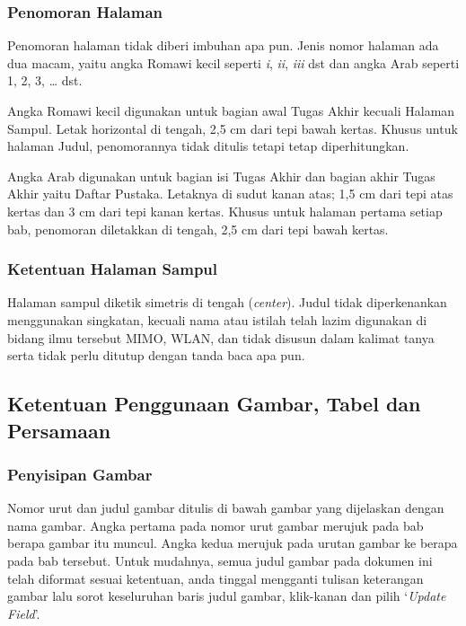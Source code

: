 \documentclass{final_project}
\begin{document}
\subsubsection{Penomoran Halaman}

Penomoran halaman tidak diberi imbuhan apa pun. Jenis nomor halaman ada dua macam, yaitu angka Romawi kecil seperti \textit{i}, \textit{ii}, \textit{iii} dst dan angka Arab seperti 1, 2, 3, … dst.

Angka Romawi kecil digunakan untuk bagian awal Tugas Akhir kecuali Halaman Sampul. Letak horizontal di tengah, 2,5 cm dari tepi bawah kertas. Khusus untuk halaman Judul, penomorannya tidak ditulis tetapi tetap diperhitungkan. 

Angka Arab digunakan untuk bagian isi Tugas Akhir dan bagian akhir Tugas Akhir yaitu Daftar Pustaka. Letaknya di sudut kanan atas; 1,5 cm dari tepi atas kertas dan 3 cm dari tepi kanan kertas. Khusus untuk halaman pertama setiap bab, penomoran diletakkan di tengah, 2,5 cm dari tepi bawah kertas. 

\subsubsection{Ketentuan Halaman Sampul}

Halaman sampul diketik simetris di tengah (\textit{center}). Judul tidak diperkenankan menggunakan singkatan, kecuali nama atau istilah telah lazim digunakan di bidang ilmu tersebut MIMO, WLAN,  dan tidak disusun dalam kalimat tanya serta tidak perlu ditutup dengan tanda baca apa pun. 

\subsection{Ketentuan Penggunaan Gambar, Tabel dan Persamaan}

\subsubsection{Penyisipan Gambar}

Nomor urut dan judul gambar ditulis di bawah gambar yang dijelaskan dengan nama gambar. Angka pertama pada nomor urut gambar merujuk pada bab berapa gambar itu muncul. Angka kedua merujuk pada urutan gambar ke berapa pada bab tersebut. Untuk mudahnya, semua judul gambar pada dokumen ini telah diformat sesuai ketentuan, anda tinggal mengganti tulisan keterangan gambar lalu sorot keseluruhan baris judul gambar, klik-kanan dan pilih ‘\textit{Update Field}’.
\end{document}
